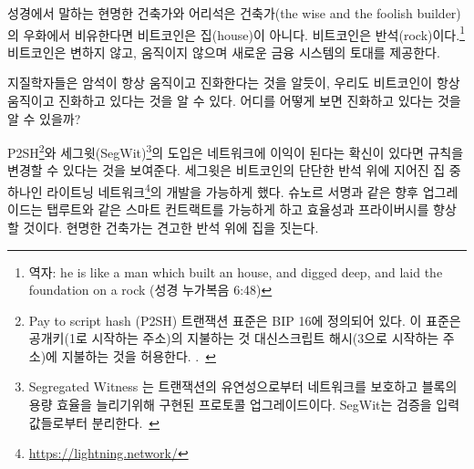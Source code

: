 \begin{comment}
Arguably, in this parable of the wise and the foolish builders Bitcoin
isn't the house. It is the rock. Unchangeable, unmoving, providing the
foundation for a new financial system.
\end{comment}
성경에서 말하는 현명한 건축가와 어리석은 건축가(the wise and the foolish builder)의 우화에서 비유한다면
비트코인은 집(house)이 아니다. 비트코인은 반석(rock)이다.\footnote{역자: he is like a man which built an house, and digged deep, and laid the foundation on a rock (성경 누가복음 6:48)}
비트코인은 변하지 않고, 움직이지 않으며 새로운 금융 시스템의 토대를 제공한다.

\begin{comment}
Just like geologists, who know that rock formations are always moving
and evolving, one can see that Bitcoin is always moving and evolving as
well. You just have to know where to look and how to look at it.
\end{comment}
지질학자들은 암석이 항상 움직이고 진화한다는 것을 알듯이,
우리도 비트코인이 항상 움직이고 진화하고 있다는 것을 알 수 있다.
어디를 어떻게 보면 진화하고 있다는 것을 알 수 있을까?

\begin{comment}
The introduction of pay to script hash\footnote{ Pay to script hash (P2SH)
transactions were standardised in BIP 16. They allow transactions to be sent to
a script hash (address starting with 3) instead of a public key hash (addresses
starting with 1).~\cite{btcwiki:p2sh}} and segregated
witness\footnote{Segregated Witness (abbreviated as SegWit) is an implemented
protocol upgrade intended to provide protection from transaction malleability
and increase block capacity. SegWit separates the \textit{witness} from the list
of inputs.~\cite{btcwiki:segwit}} are proof that Bitcoin's rules can be changed
if enough users are convinced that adopting said change is to the benefit of the
network. The latter enabled the development of the lightning
network\footnote{\url{https://lightning.network/}}, which is one of the houses
being built on Bitcoin's solid foundation. Future upgrades like Schnorr
signatures~\cite{bip:schnorr} will enhance efficiency and privacy, as well as
scripts (read: smart contracts) which will be indistinguishable from regular
transactions thanks to Taproot~\cite{taproot}. Wise builders do indeed build on
solid foundations.
\end{comment}
P2SH\footnote{Pay to script hash (P2SH)
트랜잭션 표준은 BIP 16에 정의되어 있다. 이 표준은 공개키(1로 시작하는 주소)의 지불하는 것 대신스크립트 해시(3으로 시작하는 주소)에 지불하는 것을 허용한다.
.~\cite{btcwiki:p2sh}}와
세그윗(SegWit)\footnote{Segregated Witness 는
	트랜잭션의 유연성으로부터 네트워크를 보호하고 블록의 용량 효율을 늘리기위해 구현된 프로토콜 업그레이드이다.
	SegWit는 검증을 입력값들로부터 분리한다.~\cite{btcwiki:segwit}}의 도입은
네트워크에 이익이 된다는 확신이 있다면 규칙을 변경할 수 있다는 것을 보여준다.
세그윗은 비트코인의 단단한 반석 위에 지어진 집 중 하나인 라이트닝 네트워크\footnote{\url{https://lightning.network/}}의 개발을 가능하게 했다.
슈노르 서명\cite{bip:schnorr}과 같은 향후 업그레이드는 탭루트와 같은 스마트 컨트랙트를 가능하게 하고 
효율성과 프라이버시를 향상할 것이다.
현명한 건축가는 견고한 반석 위에 집을 짓는다.

